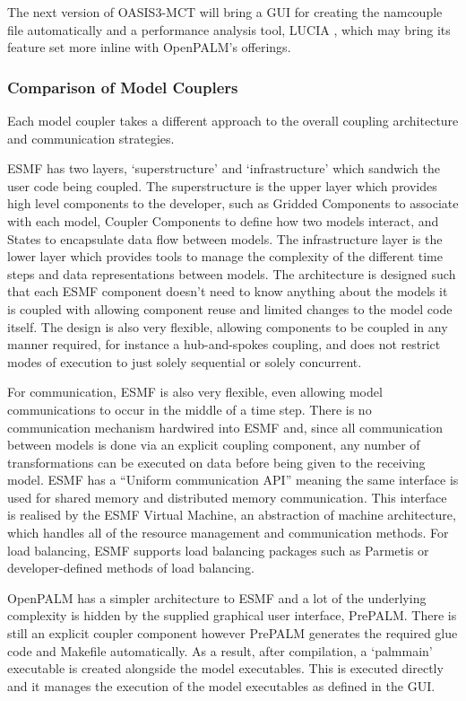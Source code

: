 \documentclass{acm_proc_article-sp}
\renewcommand{\_}{\underscore\hspace{0pt}}
\begin{document}
The next version of OASIS3-MCT will bring a GUI for creating the namcouple file
automatically and a performance analysis tool, LUCIA \cite{Maisonnave}, which
may bring its feature set more inline with OpenPALM's offerings.

\subsubsection*{Comparison of Model Couplers}

Each model coupler takes a different approach to the overall coupling
architecture and communication strategies.

ESMF has two layers, `superstructure' and `infrastructure' which sandwich the
user code being coupled. The superstructure is the upper layer which provides
high level components to the developer, such as Gridded Components to associate
with each model, Coupler Components to define how two models interact, and
States to encapsulate data flow between models. The infrastructure layer is the
lower layer which provides tools to manage the complexity of the different time
steps and data representations between models. The architecture is designed such
that each ESMF component doesn't need to know anything about the models it is
coupled with allowing component reuse and limited changes to the model code
itself. The design is also very flexible, allowing components to be coupled in
any manner required, for instance a hub-and-spokes coupling, and does not
restrict modes of execution to just solely sequential or solely concurrent.

For communication, ESMF is also very flexible, even allowing model
communications to occur in the middle of a time step. There is no communication
mechanism hardwired into ESMF and, since all communication between models is
done via an explicit coupling component, any number of transformations can be
executed on data before being given to the receiving model. ESMF has a ``Uniform
communication API'' \cite{ESMF2014} meaning the same interface is used for
shared memory and distributed memory communication. This interface is realised
by the ESMF Virtual Machine, an abstraction of machine architecture, which
handles all of the resource management and communication methods. For load
balancing, ESMF supports load balancing packages such as Parmetis
\cite{Hoefler2010,Karypis1998} or developer-defined methods of load balancing.

OpenPALM has a simpler architecture to ESMF and a lot of the underlying
complexity is hidden by the supplied graphical user interface, PrePALM. There is
still an explicit coupler component however PrePALM generates the required glue
code and Makefile automatically. As a result, after compilation, a `palm\_main'
executable is created alongside the model executables. This is executed directly
and it manages the execution of the model executables as defined in the GUI.
\end{document}
